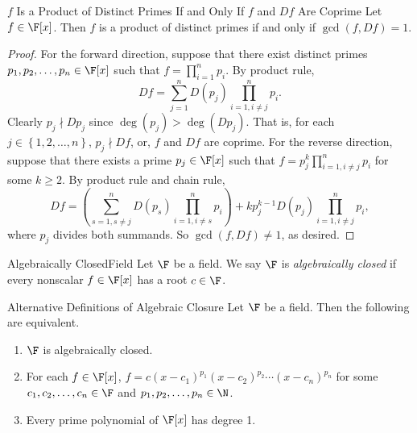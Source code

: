 \documentclass[linearalgebraII]{subfiles}
\begin{document}
    \begin{prop}{$f$ Is a Product of Distinct Primes If and Only If $f$ and $Df$ Are Coprime}
        Let $f\in \F[x]$. Then $f$ is a product of distinct primes if and only if $\gcd(f, Df) = 1$.
    \end{prop}

    \begin{proof}
        For the forward direction, suppose that there exist distinct primes $p_1, p_2, \ldots, p_n\in \F[x]$ such that $f = \prod^{n}_{i=1} p_i$. By product rule,
        \begin{equation*}
            Df = \sum^{n}_{j=1} D(p_j) \prod^{n}_{i=1, i\neq j} p_i. 
        \end{equation*}
        Clearly $p_j\nmid Dp_j$ since $\deg(p_j) > \deg(Dp_j)$. That is, for each $j\in \left\lbrace 1, 2, \ldots, n \right\rbrace$, $p_j\nmid Df$, or, $f$ and $Df$ are coprime. For the reverse direction, suppose that there exists a prime $p_j\in \F[x]$ such that $f = p_j^k \prod^{n}_{i=1, i\neq j} p_i$ for some $k\geq 2$. By product rule and chain rule,
        \begin{equation*}
            Df = \left( \sum^{n}_{s=1, s\neq j} D(p_s) \prod^{n}_{i=1, i\neq s} p_i  \right) + kp_j^{k-1} D(p_j) \prod^{n}_{i=1, i\neq j} p_i, 
        \end{equation*}
        where $p_j$ divides both summands. So $\gcd(f, Df)\neq 1$, as desired.
    \end{proof}

    \begin{definition}{Algebraically Closed}{Field}
        Let $\F$ be a field. We say $\F$ is \emph{algebraically closed} if every nonscalar $f\in \F[x]$ has a root $c\in \F$.
    \end{definition}

    \begin{prop}{Alternative Definitions of Algebraic Closure}
        Let $\F$ be a field. Then the following are equivalent.
        \begin{enumerate}
            \item $\F$ is algebraically closed.
            \item For each $f\in \F[x]$, $f = c(x-c_1)^{p_1} (x-c_2)^{p_2} \cdots (x-c_n)^{p_n}$ for some $c_1, c_2, \ldots, c_n\in \F$ and $p_1, p_2, \ldots, p_n\in \N$.
            \item Every prime polynomial of $\F[x]$ has degree 1.
        \end{enumerate}
    \end{prop}
\end{document}
